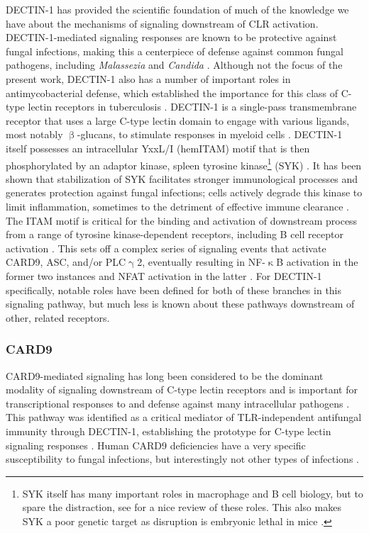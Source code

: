 DECTIN\hyp{}1 has provided the scientific foundation of much of the knowledge we have about the mechanisms of signaling downstream of CLR activation. DECTIN\hyp{}1\hyp{}mediated signaling responses are known to be protective against fungal infections, making this a centerpiece of defense against common fungal pathogens, including \textit{Malassezia} and \textit{Candida} \citep{Shiokawa2017}. Although not the focus of the present work, DECTIN\hyp{}1 also has a number of important roles in antimycobacterial defense, which established the importance for this class of C\hyp{}type lectin receptors in tuberculosis \citep{Yadav2006}. DECTIN\hyp{}1 is a single\hyp{}pass transmembrane receptor that uses a large C\hyp{}type lectin domain to engage with various ligands, most notably $\upbeta$\hyp{}glucans, to stimulate responses in myeloid cells \citep{Brown2007}. DECTIN\hyp{}1 itself possesses an intracellular YxxL/I (hemITAM) motif that is then phosphorylated by an adaptor kinase, spleen tyrosine kinase\footnote{SYK itself has many important roles in macrophage and B cell biology, but to spare the distraction, see \citet{Mocsai2010} for a nice review of these roles. This also makes SYK a poor genetic target as disruption is embryonic lethal in mice \citep{Yanagi2001}.} (SYK) \citep{Getahun2015, Kerrigan2011, Bauer2017}. It has been shown that stabilization of SYK facilitates stronger immunological processes and generates protection against fungal infections; cells actively degrade this kinase to limit inflammation, sometimes to the detriment of effective immune clearance \citep{Wirnsberger2016, Zhu2016, Sohn2003}. The ITAM motif is critical for the binding and activation of downstream process from a range of tyrosine kinase\hyp{}dependent receptors, including B cell receptor activation \citep{Monroe2006, Bauer2017}. This sets off a complex series of signaling events that activate CARD9, ASC, and/or PLC$\upgamma$2, eventually resulting in NF\hyp{}$\upkappa$B activation in the former two instances and NFAT activation in the latter \citep{Geijtenbeek2009, Drummond2013}. For DECTIN\hyp{}1 specifically, notable roles have been defined for both of these branches in this signaling pathway, but much less is known about these pathways downstream of other, related receptors.

\subsubsection{CARD9}\label{clr:card9}

CARD9\hyp{}mediated signaling has long been considered to be the dominant modality of signaling downstream of C\hyp{}type lectin receptors and is important for transcriptional responses to and defense against many intracellular pathogens \citep{Hsu2007, Hara2007}. This pathway was identified as a critical mediator of TLR\hyp{}independent antifungal immunity through DECTIN\hyp{}1, establishing the prototype for C\hyp{}type lectin signaling responses \citep{Gross2006}. Human CARD9 deficiencies have a very specific susceptibility to fungal infections, but interestingly not other types of infections \citep{Drummond2018, Drummond2016}.


